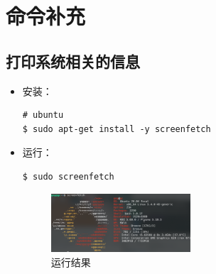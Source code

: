\chapter{命令补充}

\section{打印系统相关的信息}
\begin{itemize}
\item 安装：
\begin{lstlisting}
# ubuntu 
$ sudo apt-get install -y screenfetch 
\end{lstlisting}

\item 运行：
\begin{lstlisting}
$ sudo screenfetch
\end{lstlisting}


\begin{figure}[htp]  
    \centering
    \includegraphics[width=0.49\textwidth]{./img/screenfetch/ubuntu.png}
    \caption{运行结果} %
    \label{fig:ubuntu_screenfetch} %
\end{figure}
\end{itemize}
\newpage

